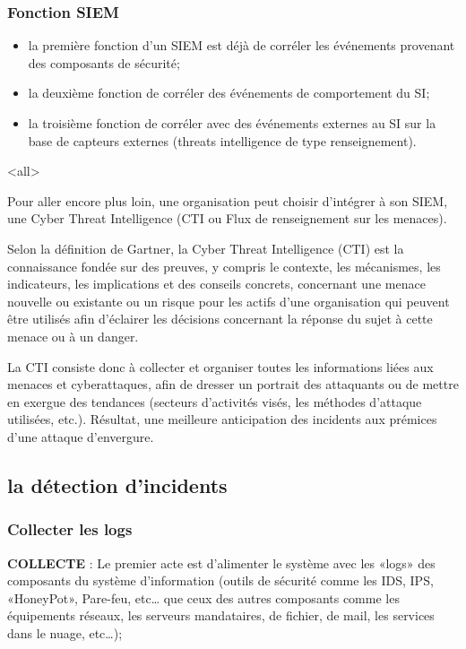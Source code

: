 \begin{frame}
\frametitle<presentation>{Fonction SIEM}
\begin{itemize}
  \item la première fonction d'un SIEM est déjà de corréler les événements provenant des composants de sécurité;
  \item la deuxième  fonction de corréler des événements de comportement du SI;
  \item la troisième fonction de corréler avec des événements externes au SI sur la base de capteurs externes (threats intelligence de type renseignement).
\end{itemize}
\end{frame}


\mode<all>{}

Pour aller encore plus loin, une organisation peut choisir d’intégrer à son SIEM,  une Cyber Threat Intelligence (CTI ou Flux de renseignement sur les menaces). 

Selon la définition de Gartner, la Cyber Threat Intelligence (CTI) est la connaissance fondée sur des preuves, y compris le contexte, les mécanismes, les indicateurs, les implications et des conseils concrets, concernant une menace nouvelle ou existante ou un risque pour les actifs d’une organisation qui peuvent être utilisés afin d’éclairer les décisions concernant la réponse du sujet à cette menace ou à un danger.

La CTI consiste donc à collecter et organiser toutes les informations liées aux menaces et cyberattaques, afin de dresser un portrait des attaquants ou de mettre en exergue des tendances (secteurs d’activités visés, les méthodes d’attaque utilisées, etc.). Résultat, une meilleure anticipation des incidents aux prémices d’une attaque d’envergure.

 \subsection{la détection d'incidents}

\subsubsection {Collecter les logs }
\textbf{COLLECTE}  : Le premier acte est d'alimenter le système avec les «logs» des composants du système d’information (outils de sécurité comme les IDS, IPS, «HoneyPot», Pare-feu, etc… que ceux des autres composants comme les équipements réseaux, les serveurs mandataires, de fichier, de mail, les services dans le nuage, etc…);
